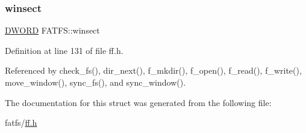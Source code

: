 \subsubsection{\texorpdfstring{winsect}{winsect}}
{\footnotesize\ttfamily \hyperlink{integer_8h_ad342ac907eb044443153a22f964bf0af}{D\+W\+O\+RD} F\+A\+T\+F\+S\+::winsect}



Definition at line 131 of file ff.\+h.



Referenced by check\+\_\+fs(), dir\+\_\+next(), f\+\_\+mkdir(), f\+\_\+open(), f\+\_\+read(), f\+\_\+write(), move\+\_\+window(), sync\+\_\+fs(), and sync\+\_\+window().



The documentation for this struct was generated from the following file\+:\begin{DoxyCompactItemize}
\item 
fatfs/\hyperlink{ff_8h}{ff.\+h}\end{DoxyCompactItemize}
